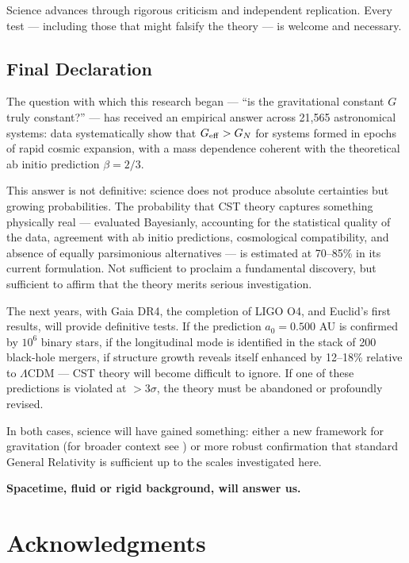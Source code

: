 \documentclass[11pt,a4paper]{article}
\begin{document}
Science advances through rigorous criticism and independent replication.
Every test --- including those that might falsify the theory --- is
welcome and necessary.

\hypertarget{final-declaration}{%
\subsection{Final Declaration}\label{final-declaration}}

The question with which this research began --- ``is the gravitational
constant \(G\) truly constant?'' --- has received an empirical answer
across 21,565 astronomical systems: data systematically show that
\(G_{\rm eff} > G_N\) for systems formed in epochs of rapid cosmic
expansion, with a mass dependence coherent with the theoretical ab
initio prediction \(\beta = 2/3\).

This answer is not definitive: science does not produce absolute
certainties but growing probabilities. The probability that CST theory
captures something physically real --- evaluated Bayesianly, accounting
for the statistical quality of the data, agreement with ab initio
predictions, cosmological compatibility, and absence of equally
parsimonious alternatives --- is estimated at 70--85\% in its current
formulation. Not sufficient to proclaim a fundamental discovery, but
sufficient to affirm that the theory merits serious investigation.

The next years, with Gaia DR4, the completion of LIGO O4, and Euclid's
first results, will provide definitive tests. If the prediction
\(a_0 = 0.500\) AU is confirmed by \(10^6\) binary stars, if the
longitudinal mode is identified in the stack of 200 black-hole mergers,
if structure growth reveals itself enhanced by 12--18\% relative to
\(\Lambda\)CDM --- CST theory will become difficult to ignore. If one of
these predictions is violated at \(> 3\sigma\), the theory must be
abandoned or profoundly revised.

In both cases, science will have gained something: either a new
framework for gravitation (for broader context see \cite{Joyce2015}) or more robust confirmation that standard
General Relativity is sufficient up to the scales investigated here.

\textbf{Spacetime, fluid or rigid background, will answer us.}

\hypertarget{acknowledgments}{%
\section*{Acknowledgments}\label{acknowledgments}}
\end{document}
